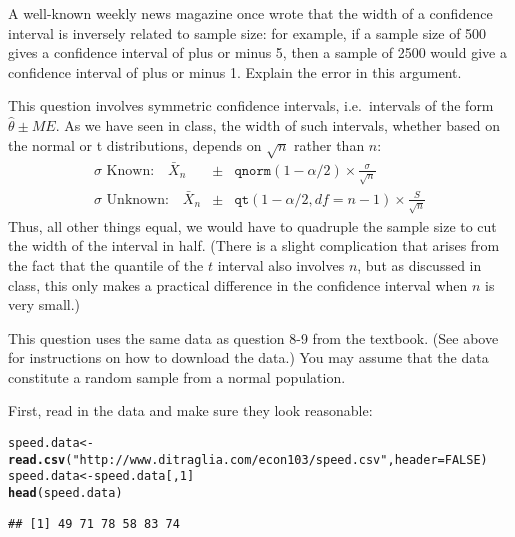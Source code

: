 \documentclass[addpoints,12pt]{exam}\usepackage[]{graphicx}\usepackage[]{color}
\makeatletter
\newcommand{\hlnum}[1]{\textcolor[rgb]{0.686,0.059,0.569}{#1}}%
\newcommand{\hlstr}[1]{\textcolor[rgb]{0.192,0.494,0.8}{#1}}%
\newcommand{\hlstd}[1]{\textcolor[rgb]{0.345,0.345,0.345}{#1}}%
\newcommand{\hlkwb}[1]{\textcolor[rgb]{0.69,0.353,0.396}{#1}}%
\newcommand{\hlkwc}[1]{\textcolor[rgb]{0.333,0.667,0.333}{#1}}%
\newcommand{\hlkwd}[1]{\textcolor[rgb]{0.737,0.353,0.396}{\textbf{#1}}}%
\newenvironment{kframe}{%
 \def\at@end@of@kframe{}%
 \ifinner\ifhmode%
  \def\at@end@of@kframe{\end{minipage}}%
  \begin{minipage}{\columnwidth}%
 \fi\fi%
 \def\FrameCommand##1{\hskip\@totalleftmargin \hskip-\fboxsep
 \colorbox{shadecolor}{##1}\hskip-\fboxsep
     \hskip-\linewidth \hskip-\@totalleftmargin \hskip\columnwidth}%
 \MakeFramed {\advance\hsize-\width
   \@totalleftmargin\z@ \linewidth\hsize
   \@setminipage}}%
 {\par\unskip\endMakeFramed%
 \at@end@of@kframe}
\newenvironment{knitrout}{}{} %
\makeatother
\begin{document}
\begin{questions}
\question A well-known weekly news magazine once wrote that the width of a confidence interval is inversely related to sample size: for example, if a sample size of 500 gives a confidence interval of plus or minus 5, then a sample of 2500 would give a confidence interval of plus or minus 1. Explain the error in this argument.
	\begin{solution}
		This question involves symmetric confidence intervals, i.e.\ intervals of the form $\widehat{\theta} \pm ME$. As we have seen in class, the width of such intervals, whether based on the normal or t distributions, depends on $\sqrt{n}$ rather than $n$:
			\begin{eqnarray*}
			 \sigma \mbox{ Known:} \quad  \bar{X}_n &\pm&  \texttt{qnorm}(1 - \alpha/2) \times \frac{\sigma}{\sqrt{n}}\\
			\sigma \mbox{ Unknown:} \quad  \bar{X}_n &\pm& \texttt{qt}(1 - \alpha/2, df = n-1) \times \frac{S}{\sqrt{n}}
			\end{eqnarray*}
 Thus, all other things equal, we would have to quadruple the sample size to cut the width of the interval in half. (There is a slight complication that arises from the fact that the quantile of the $t$ interval also involves $n$, but as discussed in class, this only makes a practical difference in the confidence interval when $n$ is very small.)
	\end{solution}

\question This question uses the same data as question 8-9 from the textbook. (See above for instructions on how to download the data.) You may assume that the data constitute a random sample from a normal population.
  \begin{solution}
  First, read in the data and make sure they look reasonable:
\begin{knitrout}
\color{fgcolor}\begin{kframe}
\begin{alltt}
\hlstd{speed.data} \hlkwb{<-} \hlkwd{read.csv}\hlstd{(}\hlstr{"http://www.ditraglia.com/econ103/speed.csv"}\hlstd{,} \hlkwc{header} \hlstd{=} \hlnum{FALSE}\hlstd{)}
\hlstd{speed.data} \hlkwb{<-} \hlstd{speed.data[,}\hlnum{1}\hlstd{]}
\hlkwd{head}\hlstd{(speed.data)}
\end{alltt}
\begin{verbatim}
## [1] 49 71 78 58 83 74
\end{verbatim}
\end{kframe}
\end{knitrout}
  \end{solution}
	\begin{parts}

\end{parts}
\end{questions}
\end{document}
